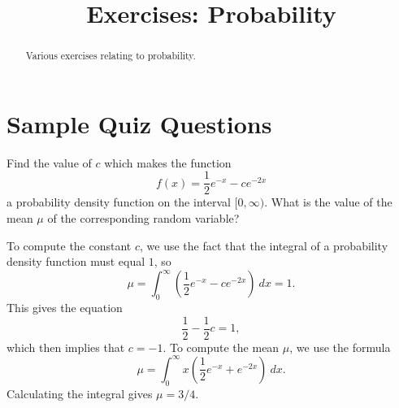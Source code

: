 \documentclass{ximera}
\title{Exercises: Probability}
\begin{document}
\begin{abstract}
Various exercises relating to probability.
\end{abstract}
\maketitle


\section*{Sample Quiz Questions}
\begin{question}%

Find the value of \(c\) which makes the function
\[f(x) = \frac{1}{2}e^{-x} - ce^{-2x}\]
a probability density function on the interval \([0, \infty)\). 
What is the value of the mean \(\mu\) of the corresponding random variable?
\begin{multiplechoice}
\end{multiplechoice}
\begin{feedback}
To compute the constant \(c\), we use the fact that the integral of a probability density function must equal \(1\), so 
\[ \mu = \int_{0}^{\infty} \left( \frac{1}{2}e^{-x} - ce^{-2x} \right) ~ dx = 1.\]
This gives the equation \[\frac{1}{2} - \frac{1}{2}c = 1,\]
which then implies that \(c = -1\). To compute the mean \(\mu\), we use the formula
\[ \mu = \int_{0}^{\infty} x \left( \frac{1}{2}e^{-x} + e^{-2x} \right) ~ dx.\]
 Calculating the integral gives \(\mu = 3/4.\)
\end{feedback}

\end{question}
\end{document}
